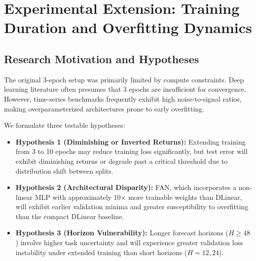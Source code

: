 \documentclass[conference,10pt]{IEEEtran}
\begin{document}
\section{Experimental Extension: Training Duration and Overfitting Dynamics}
\label{sec:extension}

\subsection{Research Motivation and Hypotheses}
The original 3-epoch setup was primarily limited by compute constraints. Deep learning literature often presumes that 3 epochs are insufficient for convergence. However, time-series benchmarks frequently exhibit high noise-to-signal ratios, making overparameterized architectures prone to early overfitting.

We formulate three testable hypotheses:
\begin{itemize}
    \item \textbf{Hypothesis 1 (Diminishing or Inverted Returns):} Extending training from 3 to 10 epochs may reduce training loss significantly, but test error will exhibit diminishing returns or degrade past a critical threshold due to distribution shift between splits.
    \item \textbf{Hypothesis 2 (Architectural Disparity):} FAN, which incorporates a non-linear MLP with approximately 10$\times$ more trainable weights than DLinear, will exhibit earlier validation minima and greater susceptibility to overfitting than the compact DLinear baseline.
    \item \textbf{Hypothesis 3 (Horizon Vulnerability):} Longer forecast horizons ($H \ge 48$) involve higher task uncertainty and will experience greater validation loss instability under extended training than short horizons ($H=12, 24$).
\end{itemize}
\end{document}
